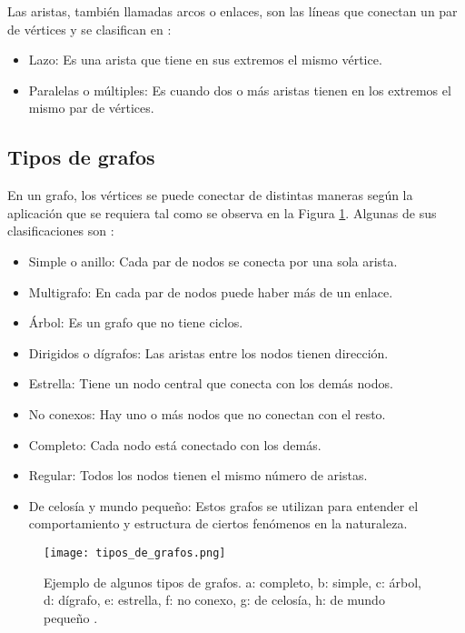 Las aristas, también llamadas arcos o enlaces, son las líneas que conectan un par de vértices y se clasifican en \cite{teoria_de_grafos}:

\begin{itemize}
	\item Lazo: Es una arista que tiene en sus extremos el mismo vértice. 
	\item Paralelas o múltiples: Es cuando dos o más aristas tienen en los extremos el mismo par de vértices.
\end{itemize}

\subsection{Tipos de grafos}
En un grafo, los vértices se puede conectar de distintas maneras según la aplicación que se requiera tal como se observa en la Figura \ref{fig:tipos_de_grafos}. Algunas de sus clasificaciones son \cite{tipos_de_grafos}:

\begin{itemize}
	\item Simple o anillo: Cada par de nodos se conecta por una sola arista.
	\item Multigrafo: En cada par de nodos puede haber más de un enlace.
	\item Árbol: Es un grafo que no tiene ciclos.
	\item Dirigidos o dígrafos: Las aristas entre los nodos tienen dirección.
	\item Estrella: Tiene un nodo central que conecta con los demás nodos.
	\item No conexos: Hay uno o más nodos que no conectan con el resto.
	\item Completo: Cada nodo está conectado con los demás.
	\item Regular: Todos los nodos tienen el mismo número de aristas.
	\item De celosía y mundo pequeño: Estos grafos se utilizan para entender el comportamiento y estructura de ciertos fenómenos en la naturaleza.
\end{itemize}

\begin{figure}[H]
	\centering
	\texttt{[image: tipos\_de\_grafos.png]}
	\caption{Ejemplo de algunos tipos de grafos. a: completo, b: simple, c: árbol, d: dígrafo, e: estrella, f: no conexo, g: de celosía, h: de mundo pequeño \cite{tipos_de_grafos}.}
	\label{fig:tipos_de_grafos}
\end{figure}

